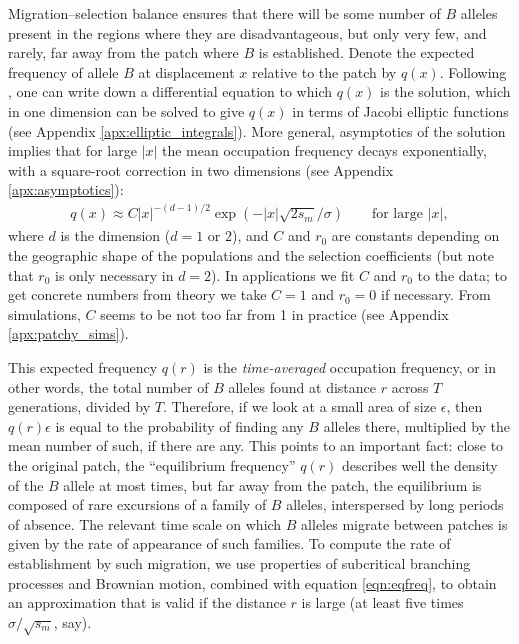 \documentclass{article}
\begin{document}
Migration--selection balance ensures that 
there will be some number of $B$ alleles present in the regions where they are disadvantageous,
but only very few, and rarely, far away from the patch where $B$ is established.
Denote the expected frequency of allele $B$ at displacement $x$ relative to the patch by $q(x)$.
Following \citet{slatkin1973geneflow}, one can write down a differential equation to which $q(x)$ is the solution,
which in one dimension can be solved to give $q(x)$ in terms of Jacobi elliptic functions (see Appendix \ref{apx:elliptic_integrals}).
More general, asymptotics of the solution implies that for large $|x|$ the mean occupation frequency decays exponentially, with a square-root correction in two dimensions (see Appendix \ref{apx:asymptotics}): 
\begin{align} \label{eqn:eqfreq}
    q(x) \approx C |x|^{-(d-1)/2} \exp( - |x| \sqrt{2 s_m} / \sigma) \qquad \text{for large $|x|$},
\end{align}
where $d$ is the dimension ($d=1$ or $2$), and $C$ and $r_0$ are constants depending on the geographic shape of the populations and the selection coefficients
(but note that $r_0$ is only necessary in $d=2$).
In applications we fit $C$ and $r_0$ to the data;
to get concrete numbers from theory we take $C=1$ and $r_0=0$ if necessary.
From simulations, $C$ seems to be not too far from 1 in practice (see Appendix \ref{apx:patchy_sims}).

This expected frequency $q(r)$ is the \emph{time-averaged} occupation frequency,
or in other words, the total number of $B$ alleles found at distance $r$ across $T$ generations, divided by $T$.
Therefore, if we look at a small area of size $\epsilon$, 
then $q(r) \epsilon$ is equal to the probability of finding any $B$ alleles there,
multiplied by the mean number of such, if there are any.
This points to an important fact: 
close to the original patch, the ``equilibrium frequency'' $q(r)$ describes well the density of the $B$ allele at most times,
but far away from the patch, 
the equilibrium is composed of rare excursions of a family of $B$ alleles, interspersed by long periods of absence.
The relevant time scale on which $B$ alleles migrate between patches is given by the rate of appearance of such families.
To compute the rate of establishment by such migration,
we use properties of subcritical branching processes and Brownian motion,
combined with equation \eqref{eqn:eqfreq},
to obtain an approximation that is valid if the distance $r$ is large (at least five times $\sigma/\sqrt{s_m}$, say).
\end{document}
